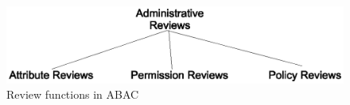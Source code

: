 	\begin{figure} 
		\centering
		\includegraphics[width=.4\textwidth]{review-function-diagram}
		\caption{Review functions in ABAC}
		\label{fig:labac}
	\end{figure}
	